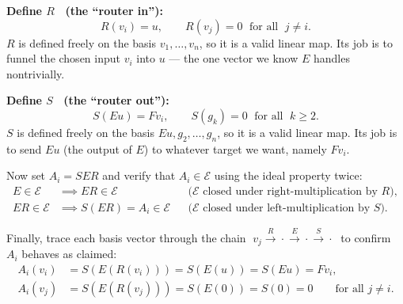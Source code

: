 \documentclass[12pt]{article}
\theoremstyle{mythmstyle}
\begin{document}
\vspace{10pt}

\noindent\textbf{Define $R$ \ (the ``router in''):}
\[
    R(v_i) = u, \qquad R(v_j) = 0 \;\text{ for all }\; j \neq i.
\]
$R$ is defined freely on the basis $v_1, \ldots, v_n$, so it is a valid
linear map. Its job is to funnel the chosen input $v_i$ into $u$ --- the
one vector we know $E$ handles nontrivially.

\vspace{10pt}

\noindent\textbf{Define $S$ \ (the ``router out''):}
\[
    S(Eu) = Fv_i, \qquad S(g_k) = 0 \;\text{ for all }\; k \geq 2.
\]
$S$ is defined freely on the basis $Eu, g_2, \ldots, g_n$, so it is a
valid linear map. Its job is to send $Eu$ (the output of $E$) to whatever
target we want, namely $Fv_i$.

\vspace{12pt}

\noindent Now set $A_i = SER$ and verify that $A_i \in \mathcal{E}$
using the ideal property twice:
\begin{align*}
    E \in \mathcal{E}
    &\implies ER \in \mathcal{E}
    &&\text{($\mathcal{E}$ closed under right-multiplication by $R$)},\\[6pt]
    ER \in \mathcal{E}
    &\implies S(ER) = A_i \in \mathcal{E}
    &&\text{($\mathcal{E}$ closed under left-multiplication by $S$)}.
\end{align*}

\vspace{4pt}

Finally, trace each basis vector through the chain
$\;v_j \xrightarrow{R} \cdot \xrightarrow{E} \cdot \xrightarrow{S} \cdot\;$
to confirm $A_i$ behaves as claimed:
\begin{align*}
    A_i(v_i) &= S\!\left(E\!\left(R(v_i)\right)\right)
               = S(E(u)) = S(Eu) = Fv_i, \\[6pt]
    A_i(v_j) &= S\!\left(E\!\left(R(v_j)\right)\right)
               = S(E(0)) = S(0) = 0
               \qquad \text{for all } j \neq i.
\end{align*}
\end{document}
